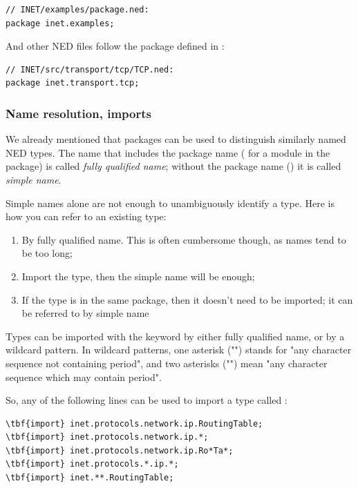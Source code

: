 \begin{Verbatim}
// INET/examples/package.ned:
package inet.examples;
\end{Verbatim}

And other NED files follow the package defined in :

\begin{Verbatim}
// INET/src/transport/tcp/TCP.ned:
package inet.transport.tcp;
\end{Verbatim}


\subsubsection{Name resolution, imports}

We already mentioned that packages can be used to distinguish
similarly named NED types. The name that includes the package name
( for a  module in the 
package) is called \textit{fully qualified name}; without the package
name () it is called \textit{simple name}.

Simple names alone are not enough to unambiguously identify a type.
Here is how you can refer to an existing type:

\begin{enumerate}
  \item By fully qualified name. This is often cumbersome though,
        as names tend to be too long;
  \item Import the type, then the simple name will be enough;
  \item If the type is in the same package, then it doesn't need to be
        imported; it can be referred to by simple name
\end{enumerate}

Types can be imported with the  keyword by either
fully qualified name, or by a wildcard pattern. In wildcard patterns,
one asterisk ("\ttt{*}") stands for "any character sequence not containing
period", and two asterisks ("\ttt{**}") mean "any character sequence which may
contain period".

So, any of the following lines can be used to import a type called
:

\begin{Verbatim}[commandchars=\\\{\}]
\tbf{import} inet.protocols.network.ip.RoutingTable;
\tbf{import} inet.protocols.network.ip.*;
\tbf{import} inet.protocols.network.ip.Ro*Ta*;
\tbf{import} inet.protocols.*.ip.*;
\tbf{import} inet.**.RoutingTable;
\end{Verbatim}

